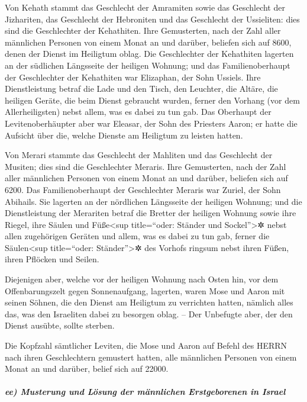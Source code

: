 Von Kehath stammt das Geschlecht der Amramiten sowie das
Geschlecht der Jizhariten, das Geschlecht der Hebroniten und das
Geschlecht der Ussieliten: dies sind die Geschlechter der Kehathiten.
Ihre Gemusterten, nach der Zahl aller männlichen Personen
von einem Monat an und darüber, beliefen sich auf 8600, denen der Dienst
im Heiligtum oblag. Die Geschlechter der Kehathiten
lagerten an der südlichen Längsseite der heiligen Wohnung;
und das Familienoberhaupt der Geschlechter der Kehathiten
war Elizaphan, der Sohn Ussiels. Ihre Dienstleistung
betraf die Lade und den Tisch, den Leuchter, die Altäre, die heiligen
Geräte, die beim Dienst gebraucht wurden, ferner den Vorhang (vor dem
Allerheiligsten) nebst allem, was es dabei zu tun gab.
Das Oberhaupt der Levitenoberhäupter aber war Eleasar,
der Sohn des Priesters Aaron; er hatte die Aufsicht über die, welche
Dienste am Heiligtum zu leisten hatten.

Von Merari stammte das Geschlecht der Mahliten und das
Geschlecht der Musiten; dies sind die Geschlechter Meraris.
Ihre Gemusterten, nach der Zahl aller männlichen Personen
von einem Monat an und darüber, beliefen sich auf 6200.
Das Familienoberhaupt der Geschlechter Meraris war
Zuriel, der Sohn Abihails. Sie lagerten an der nördlichen Längsseite der
heiligen Wohnung; und die Dienstleistung der Merariten
betraf die Bretter der heiligen Wohnung sowie ihre Riegel, ihre Säulen
und Füße\textless sup title=``oder: Ständer und Sockel''\textgreater✲
nebst allen zugehörigen Geräten und allem, was es dabei zu tun gab,
ferner die Säulen\textless sup title=``oder:
Ständer''\textgreater✲ des Vorhofs ringsum nebst ihren Füßen, ihren
Pflöcken und Seilen.

Diejenigen aber, welche vor der heiligen Wohnung nach
Osten hin, vor dem Offenbarungszelt gegen Sonnenaufgang, lagerten, waren
Mose und Aaron mit seinen Söhnen, die den Dienst am Heiligtum zu
verrichten hatten, nämlich alles das, was den Israeliten dabei zu
besorgen oblag. -- Der Unbefugte aber, der den Dienst ausübte, sollte
sterben.

Die Kopfzahl sämtlicher Leviten, die Mose und Aaron auf
Befehl des HERRN nach ihren Geschlechtern gemustert hatten, alle
männlichen Personen von einem Monat an und darüber, belief sich auf
22000.

\hypertarget{ee-musterung-und-luxf6sung-der-muxe4nnlichen-erstgeborenen-in-israel}{%
\subparagraph{ee) Musterung und Lösung der männlichen Erstgeborenen in
Israel}\label{ee-musterung-und-luxf6sung-der-muxe4nnlichen-erstgeborenen-in-israel}}

